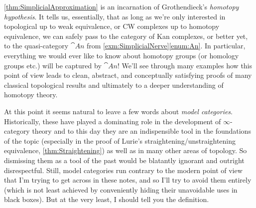 \cref{thm:SimplicialApproximation} is an incarnation of Grothendieck's \emph{homotopy hypothesis}. It tells us, essentially, that as long as we're only interested in topological up to weak equivalence, or CW complexes up to homotopy equivalence, we can safely pass to the category of Kan complexes, or better yet, to the quasi-category $\cat{An}$ from \cref{exm:SimplicialNerve}\cref{enum:An}. In particular, everything we would ever like to know about homotopy groups (or homology groups etc.) will be captured by $\cat{An}$! We'll see through many examples how this point of view leads to clean, abstract, and conceptually satisfying proofs of many classical topological results and ultimately to a deeper understanding of homotopy theory.

At this point it seems natural to leave a few words about \emph{model categories}. Historically, these have played a dominating role in the development of $\infty$-category theory and to this day they are an indispensible tool in the foundations of the topic (especially in the proof of Lurie's straightening/unstraightening equivalence, \cref{thm:Straightening}) as well as in many other areas of topology. So dismissing them as a tool of the past would be blatantly ignorant and outright disrespectful. Still, model categories run contrary to the modern point of view that I'm trying to get across in these notes, and so I'll try to avoid them entirely (which is not least achieved by conveniently hiding their unavoidable uses in black boxes). But at the very least, I should tell you the definition.	
